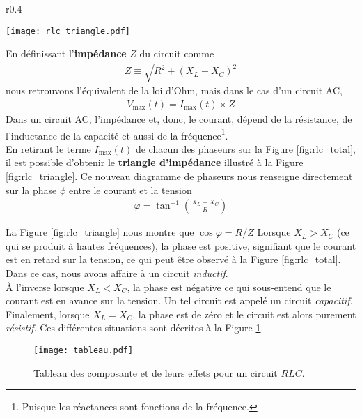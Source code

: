 \documentclass[titlepage,oneside,a4paper,11pt]{book} %
\begin{document}
\begin{wrapfigure}{r}{0.4\textwidth}
  \begin{center}
    \texttt{[image: rlc\_triangle.pdf]}
    \caption{Représentation de l'impédance d'un circuit.}
    \label{fig:rlc_triangle}
  \end{center}
\end{wrapfigure}

En définissant l'\textbf{impédance} $Z$ du circuit comme
\begin{align*}
    Z\equiv\sqrt{R^2+(X_L-X_C)^2}
\end{align*}
nous retrouvons l'équivalent de la loi d'Ohm, mais dans le cas d'un circuit AC,
\begin{align*}
    V_{\mathrm{max}}(t) = I_{\mathrm{max}}(t)\times Z
\end{align*}
Dans un circuit AC, l'impédance et, donc, le courant, dépend de la résistance, de l'inductance de la capacité et aussi de la fréquence\footnote{Puisque les réactances sont fonctions de la fréquence.}.\\

En retirant le terme $I_{\mathrm{max}}(t)$ de chacun des phaseurs sur la Figure \ref{fig:rlc_total}, il est possible d'obtenir le \textbf{triangle d'impédance} illustré à la Figure \ref{fig:rlc_triangle}. Ce nouveau diagramme de phaseurs nous renseigne directement sur la phase $\phi$ entre le courant et la tension
\begin{align*}
    \varphi=\tan ^{-1}\left(\frac{X_L-X_C}{R}\right)  
\end{align*}

La Figure \ref{fig:rlc_triangle} nous montre que $\cos \varphi = R/Z$ Lorsque $X_L>X_C$ (ce qui se produit à hautes fréquences), la phase est positive, signifiant que le courant est en retard sur la tension, ce qui peut être observé à la Figure \ref{fig:rlc_total}.  Dans ce cas, nous avons affaire à un circuit \emph{inductif}.\\

À l'inverse lorsque $X_L<X_C$, la phase est négative ce qui sous-entend que le courant est en avance sur la tension. Un tel circuit est appelé un circuit \emph{capacitif}.\\

Finalement, lorsque $X_L = X_C$, la phase est de zéro et le circuit est alors purement \emph{résistif}. Ces différentes situations sont décrites à la Figure \ref{fig:table_rlc}.

\begin{figure}[H]
  \begin{center}
    \texttt{[image: tableau.pdf]}
    \caption{Tableau des composante et de leurs effets pour un circuit $RLC$.}
    \label{fig:table_rlc}
  \end{center}
\end{figure}
\end{document}
